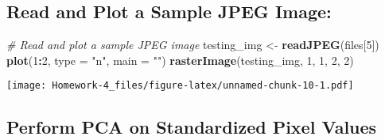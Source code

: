 \documentclass[
]{article}
\newenvironment{Shaded}{\begin{snugshade}}{\end{snugshade}}
\newcommand{\AttributeTok}[1]{\textcolor[rgb]{0.13,0.29,0.53}{#1}}
\newcommand{\CommentTok}[1]{\textcolor[rgb]{0.56,0.35,0.01}{\textit{#1}}}
\newcommand{\DecValTok}[1]{\textcolor[rgb]{0.00,0.00,0.81}{#1}}
\newcommand{\FunctionTok}[1]{\textcolor[rgb]{0.13,0.29,0.53}{\textbf{#1}}}
\newcommand{\NormalTok}[1]{#1}
\newcommand{\OtherTok}[1]{\textcolor[rgb]{0.56,0.35,0.01}{#1}}
\newcommand{\SpecialCharTok}[1]{\textcolor[rgb]{0.81,0.36,0.00}{\textbf{#1}}}
\newcommand{\StringTok}[1]{\textcolor[rgb]{0.31,0.60,0.02}{#1}}
\begin{document}
\hypertarget{read-and-plot-a-sample-jpeg-image}{%
\subsection{Read and Plot a Sample JPEG
Image:}\label{read-and-plot-a-sample-jpeg-image}}

\begin{Shaded}
\begin{Highlighting}[]
\CommentTok{\# Read and plot a sample JPEG image}
\NormalTok{testing\_img }\OtherTok{\textless{}{-}} \FunctionTok{readJPEG}\NormalTok{(files[}\DecValTok{5}\NormalTok{])}
\FunctionTok{plot}\NormalTok{(}\DecValTok{1}\SpecialCharTok{:}\DecValTok{2}\NormalTok{, }\AttributeTok{type =} \StringTok{"n"}\NormalTok{, }\AttributeTok{main =} \StringTok{""}\NormalTok{)}
\FunctionTok{rasterImage}\NormalTok{(testing\_img, }\DecValTok{1}\NormalTok{, }\DecValTok{1}\NormalTok{, }\DecValTok{2}\NormalTok{, }\DecValTok{2}\NormalTok{)}
\end{Highlighting}
\end{Shaded}

\texttt{[image: Homework-4\_files/figure-latex/unnamed-chunk-10-1.pdf]}

\hypertarget{perform-pca-on-standardized-pixel-values}{%
\subsection{Perform PCA on Standardized Pixel
Values}\label{perform-pca-on-standardized-pixel-values}}

\begin{Shaded}
\end{Shaded}
\end{document}

